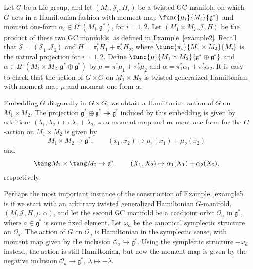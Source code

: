 \begin{Example} \label{example5}
Let $G$ be a Lie group, and let $(M_i,\mathcal{J}_i,H_i)$ be a twisted GC manifold on which $G$ acts in a Hamiltonian fashion with moment map $\func{\mu_i}{M_i}{\mathfrak{g}^*}$ and moment one-form $\alpha_i \in \Omega^1(M_i,\mathfrak{g}^*)$, for $i=1,2$.  Let $(M_1 \times M_2, \mathcal{J}, H)$ be the product of these two GC manifolds, as def\/ined in Example~\ref{example2}.  Recall that $\mathcal{J} = (\mathcal{J}_1,\mathcal{J}_2)$ and $H = \pi_1^* H_1 + \pi_2^* H_2$, where $\func{\pi_i}{M_1 \times M_2}{M_i}$ is the natural projection for $i=1,2$.  Def\/ine $\func{\mu}{M_1 \times M_2}{\mathfrak{g}^* \oplus \mathfrak{g}^*}$ and $\alpha \in \Omega^1(M_1 \times M_2, \mathfrak{g}^* \oplus \mathfrak{g}^*)$ by $\mu = \pi_1^* \mu_1 + \pi_2^* \mu_2$ and $\alpha = \pi_1^* \alpha_1 + \pi_2^* \alpha_2$.  It is easy to check that the action of $G \times G$ on $M_1 \times M_2$ is twisted generalized Hamiltonian with moment map $\mu$ and moment one-form $\alpha$.

Embedding $G$ diagonally in $G \times G$, we obtain a Hamiltonian action of $G$ on $M_1 \times M_2$.  The projection $\mathfrak{g}^* \oplus \mathfrak{g}^* \twoheadrightarrow \mathfrak{g}^*$ induced by this embedding is given by addition: $(\lambda_1, \lambda_2) \mapsto \lambda_1 + \lambda_2$, so a moment map and moment one-form for the $G$-action on $M_1 \times M_2$ is given by
\[
  M_1 \times M_2 \to \mathfrak{g}^*,
  \qquad
  (x_1,x_2) \mapsto \mu_1(x_1) + \mu_2(x_2)
\]
and
\[
  \tang M_1 \times \tang M_2
  \to \mathfrak{g}^*,
  \qquad
  (X_1,X_2) \mapsto \alpha_1(X_1) + \alpha_2(X_2),
\]
respectively.
\end{Example}


Perhaps the most important instance of the construction of Example~\ref{example5} is if we start with an arbitrary twisted generalized Hamiltonian $G$-manifold, $(M,\mathcal{J},H,\mu,\alpha)$, and let the second GC manifold be a coadjoint orbit $\mathcal{O}_{a}$ in $\mathfrak{g}^*$, where $a \in \mathfrak{g}^*$ is some f\/ixed element.  Let $\omega_{a}$ be the canonical symplectic structure on $\mathcal{O}_{a}$.  The action of $G$ on $\mathcal{O}_{a}$ is Hamiltonian in the symplectic sense, with moment map given by the inclusion $\mathcal{O}_{a} \hookrightarrow \mathfrak{g}^*$.  Using the symplectic structure $-\omega_{a}$ instead, the action is still Hamiltonian, but now the moment map is given by the negative inclusion $\mathcal{O}_{a} \to \mathfrak{g}^*$, $\lambda \mapsto -\lambda$.

